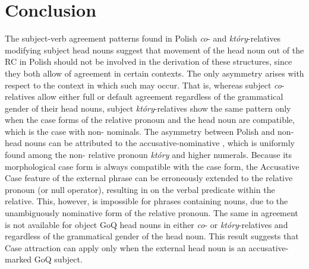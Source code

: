 \documentclass[output=paper]{langsci/langscibook}
\begin{document}
\section{Conclusion}%

The subject-verb agreement patterns found in Polish \textit{co}{}- and \textit{który}{}-relatives modifying subject head nouns suggest that movement of the head noun out of the RC in Polish should not be involved in the derivation of these structures, since they both allow  of agreement in certain contexts. The only asymmetry arises with respect to the context in which such  may occur. That is, whereas subject \textit{co}{}-relatives allow either full or default agreement regardless of the grammatical gender of their head nouns, subject \textit{który}{}-relatives show the same pattern only when the case forms of the relative pronoun and the  head noun are compatible, which is the case with non- nominals. The asymmetry between Polish  and non- head nouns can be attributed to the accusative-nominative , which is uniformly found among the non- relative pronoun \textit{który} and higher numerals. Because its morphological case form is always compatible with the  case form, the Accusative Case feature of the external  phrase can be erroneously extended to the relative pronoun (or null operator), resulting in  on the verbal predicate within the relative. This, however, is impossible for  phrases containing  nouns, due to the unambiguously nominative form of the  relative pronoun. The same  in agreement is not available for object GoQ head nouns in either \textit{co}{}- or \textit{który}{}-relatives and regardless of the grammatical gender of the head noun. This result suggests that Case attraction can apply only when the external head noun is an accusative-marked GoQ subject.
% 
% 
% 
\end{document}
